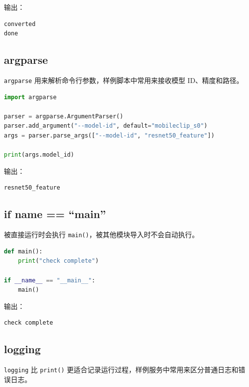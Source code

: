 输出：

\begin{lstlisting}
converted
done
\end{lstlisting}

\subsection{argparse}\label{argparse}

\passthrough{\lstinline!argparse!}
用来解析命令行参数，样例脚本中常用来接收模型 ID、精度和路径。

\begin{lstlisting}[language=Python]
import argparse

parser = argparse.ArgumentParser()
parser.add_argument("--model-id", default="mobileclip_s0")
args = parser.parse_args(["--model-id", "resnet50_feature"])

print(args.model_id)
\end{lstlisting}

输出：

\begin{lstlisting}
resnet50_feature
\end{lstlisting}

\subsection{\texorpdfstring{if \textbf{name} ==
``\textbf{main}''}{if name == ``main''}}\label{if-name-main}

被直接运行时会执行
\passthrough{\lstinline!main()!}，被其他模块导入时不会自动执行。

\begin{lstlisting}[language=Python]
def main():
    print("check complete")

if __name__ == "__main__":
    main()
\end{lstlisting}

输出：

\begin{lstlisting}
check complete
\end{lstlisting}

\subsection{logging}\label{logging}

\passthrough{\lstinline!logging!} 比 \passthrough{\lstinline!print()!}
更适合记录运行过程，样例服务中常用来区分普通日志和错误日志。

